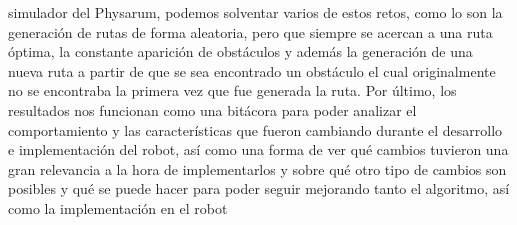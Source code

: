         simulador del Physarum, podemos solventar varios de estos retos, como lo son la
        generaci\'on de rutas de forma aleatoria, pero que siempre se acercan a una ruta \'optima,
        la constante aparici\'on de obst\'aculos y adem\'as la generaci\'on de una nueva ruta a partir
        de que se sea encontrado un obst\'aculo el cual originalmente no se encontraba la
        primera vez que fue generada la ruta.
    \vskip 0.5cm
    Por \'ultimo, los resultados nos funcionan como una bit\'acora para poder analizar el
        comportamiento y las caracter\'isticas que fueron cambiando durante el desarrollo e
        implementaci\'on del robot, as\'i como una forma de ver qu\'e cambios tuvieron una gran
        relevancia a la hora de implementarlos y sobre qu\'e otro tipo de cambios son posibles
        y qu\'e se puede hacer para poder seguir mejorando tanto el algoritmo, as\'i como la
        implementaci\'on en el robot